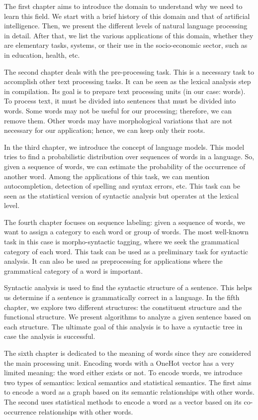 \documentclass{KBook}
\begin{document}
The first chapter aims to introduce the domain to understand why we need to learn this field.
We start with a brief history of this domain and that of artificial intelligence.
Then, we present the different levels of natural language processing in detail.
After that, we list the various applications of this domain, whether they are elementary tasks, systems, or their use in the socio-economic sector, such as in education, health, etc.

The second chapter deals with the pre-processing task.
This is a necessary task to accomplish other text processing tasks.
It can be seen as the lexical analysis step in compilation.
Its goal is to prepare text processing units (in our case: words).
To process text, it must be divided into sentences that must be divided into words.
Some words may not be useful for our processing; therefore, we can remove them.
Other words may have morphological variations that are not necessary for our application; hence, we can keep only their roots.

In the third chapter, we introduce the concept of language models.
This model tries to find a probabilistic distribution over sequences of words in a language.
So, given a sequence of words, we can estimate the probability of the occurrence of another word.
Among the applications of this task, we can mention autocompletion, detection of spelling and syntax errors, etc.
This task can be seen as the statistical version of syntactic analysis but operates at the lexical level.

The fourth chapter focuses on sequence labeling: given a sequence of words, we want to assign a category to each word or group of words.
The most well-known task in this case is morpho-syntactic tagging, where we seek the grammatical category of each word.
This task can be used as a preliminary task for syntactic analysis.
It can also be used as preprocessing for applications where the grammatical category of a word is important.

Syntactic analysis is used to find the syntactic structure of a sentence.
This helps us determine if a sentence is grammatically correct in a language.
In the fifth chapter, we explore two different structures: the constituent structure and the functional structure.
We present algorithms to analyze a given sentence based on each structure.
The ultimate goal of this analysis is to have a syntactic tree in case the analysis is successful.

The sixth chapter is dedicated to the meaning of words since they are considered the main processing unit.
Encoding words with a OneHot vector has a very limited meaning: the word either exists or not.
To encode words, we introduce two types of semantics: lexical semantics and statistical semantics.
The first aims to encode a word as a graph based on its semantic relationships with other words.
The second uses statistical methods to encode a word as a vector based on its co-occurrence relationships with other words.
\end{document}
